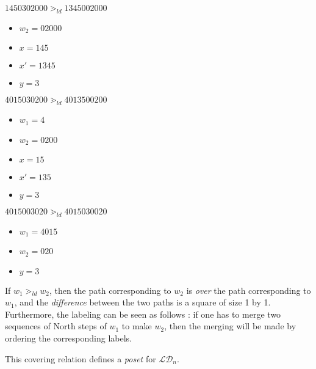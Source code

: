 \begin{example}[$n = 5$, first case]
    $1450302000 \gtrdot_{ld} 1345002000$
    \begin{itemize}
        \item $w_2 = 02000$
        \item $x = 145$
        \item $x' = 1345$
        \item $y = 3$
    \end{itemize}
    
\end{example}

\begin{example}[$n = 5$, second case]
    $4015030200 \gtrdot_{ld} 4013500200$
    \begin{itemize}
        \item $w_1 = 4$
        \item $w_2 = 0200$
        \item $x = 15$
        \item $x' = 135$
        \item $y = 3$
    \end{itemize}
    
\end{example}

\begin{example}[$n = 5$, third case]
    $4015003020 \gtrdot_{ld} 4015030020$
    \begin{itemize}
        \item $w_1 = 4015$
        \item $w_2 = 020$
        \item $y = 3$
    \end{itemize}
    
\end{example}

\begin{rem}
    If $w_1 \gtrdot_{ld} w_2$, then the path corresponding to
    $w_2$ is \emph{over} the path corresponding to $w_1$,
    and the \emph{difference} between the two paths is a
    square of size 1 by 1.\\
    Furthermore, the labeling can be seen as follows :
    if one has to merge two sequences of North steps of $w_1$
    to make $w_2$, then the merging will be made by ordering the
    corresponding labels.
\end{rem}

\begin{prop}
    This covering relation defines a \emph{poset}
    for $\mathcal{LD}_n$.
\end{prop}

